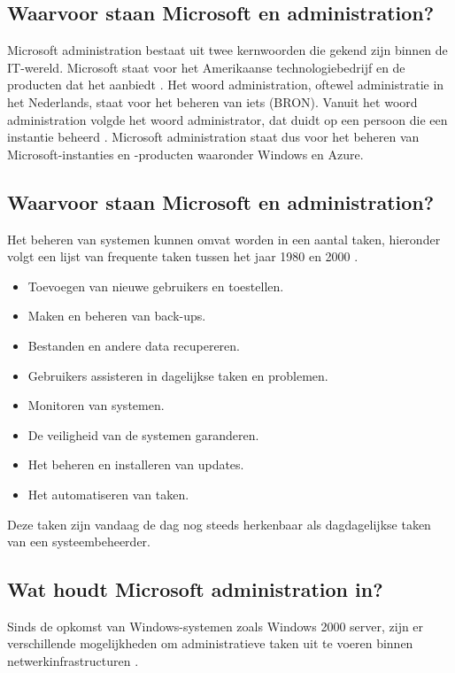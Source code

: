 \subsection{Waarvoor staan Microsoft en administration?}

Microsoft administration bestaat uit twee kernwoorden die gekend zijn binnen de IT-wereld. Microsoft staat voor het Amerikaanse technologiebedrijf en de producten dat het aanbiedt \autocite{Warner2019}. Het woord administration, oftewel administratie in het Nederlands, staat voor het beheren van iets (BRON). Vanuit het woord administration volgde het woord administrator, dat duidt op een persoon die een instantie beheerd \autocite{VDU2023}. Microsoft administration staat dus voor het beheren van Microsoft-instanties en -producten waaronder Windows en Azure. 

\subsection{Waarvoor staan Microsoft en administration?}

Het beheren van systemen kunnen omvat worden in een aantal taken, hieronder volgt een lijst van frequente taken tussen het jaar 1980 en 2000 \autocite{Frisch2002}.

\begin{itemize}
    \item Toevoegen van nieuwe gebruikers en toestellen.
    \item Maken en beheren van back-ups.
    \item Bestanden en andere data recupereren.
    \item Gebruikers assisteren in dagelijkse taken en problemen.
    \item Monitoren van systemen.
    \item De veiligheid van de systemen garanderen.
    \item Het beheren en installeren van updates.
    \item Het automatiseren van taken.
\end{itemize}

Deze taken zijn vandaag de dag nog steeds herkenbaar als dagdagelijkse taken van een systeembeheerder. 

\subsection{Wat houdt Microsoft administration in?}

Sinds de opkomst van Windows-systemen zoals Windows 2000 server, zijn er verschillende mogelijkheden om administratieve taken uit te voeren binnen netwerkinfrastructuren \autocite{Tulloch2001}. \\

